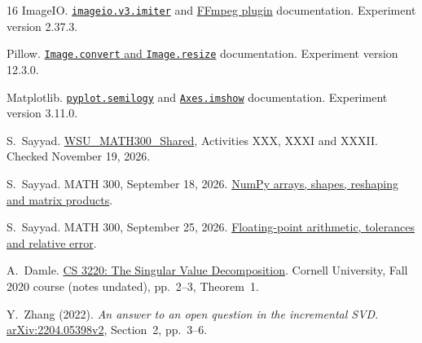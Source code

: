 \documentclass[11pt,a4paper]{article}
\newcommand{\code}[1]{\texttt{#1}}
\begin{document}
\begin{thebibliography}{16}
ImageIO. \href{https://imageio.readthedocs.io/en/stable/_autosummary/imageio.v3.imiter.html}{\code{imageio.v3.imiter}}
and \href{https://imageio.readthedocs.io/en/stable/_autosummary/imageio.plugins.ffmpeg.html}{FFmpeg plugin}
documentation. Experiment version 2.37.3.

Pillow. \href{https://pillow.readthedocs.io/en/stable/reference/Image.html}{\code{Image.convert} and \code{Image.resize}}
documentation. Experiment version 12.3.0.

Matplotlib. \href{https://matplotlib.org/stable/api/_as_gen/matplotlib.pyplot.semilogy.html}{\code{pyplot.semilogy}}
and \href{https://matplotlib.org/stable/api/_as_gen/matplotlib.axes.Axes.imshow.html}{\code{Axes.imshow}}
documentation. Experiment version 3.11.0.

S.~Sayyad. \href{https://www.overleaf.com/project/6a8b1c59a232e8dbbb5b0923}{WSU\_MATH300\_Shared},
Activities XXX, XXXI and XXXII. Checked November 19, 2026.

S.~Sayyad. MATH 300, September 18, 2026.
\href{https://github.com/say-yas/wsu_math300/blob/8acbae688a5e5ef588dca37c5ca6f17b00600ac4/Sep18/class_intro_numpy_2.ipynb}{NumPy arrays, shapes, reshaping and matrix products}.

S.~Sayyad. MATH 300, September 25, 2026.
\href{https://github.com/say-yas/wsu_math300/blob/2e41141c9a3646473619b922458d42a1e5333f66/Sep25/complexity_fp_convergence_practice.ipynb}{Floating-point arithmetic, tolerances and relative error}.

A.~Damle. \href{https://www.cs.cornell.edu/courses/cs3220/2020fa/SVD.pdf}{CS 3220: The Singular Value Decomposition}.
Cornell University, Fall 2020 course (notes undated), pp.~2--3, Theorem~1.

Y.~Zhang (2022). \emph{An answer to an open question in the incremental SVD}.
\href{https://arxiv.org/abs/2204.05398v2}{arXiv:2204.05398v2}, Section~2, pp.~3--6.
\end{thebibliography}
\endgroup
\end{document}

